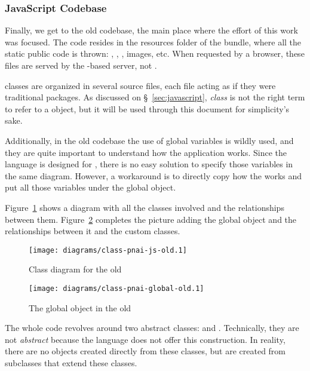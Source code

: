 \subsubsection{JavaScript Codebase} %
\label{ssub:jscodeold}

Finally, we get to the old  codebase, the main place where the effort of this work was focused.
The code resides in the resources folder of the  bundle, where all the static public code is thrown: , , , images, etc.
When requested by a browser, these files are served by the -based server, not .

 classes are organized in several source files, each file acting as if they were traditional packages.
As discussed on \S~\ref{sec:javascript}, \emph{class} is not the right term to refer to a  object, but it will be used through this document for simplicity's sake.

Additionally, in the old codebase the use of global variables is wildly used, and they are quite important to understand how the application works.
Since the  language is designed for , there is no easy solution to specify those variables in the same diagram.
However, a workaround is to directly copy how the  works and put all those variables under the global  object.

Figure~\ref{fig:class-pnai-js-old} shows a diagram with all the classes involved and the relationships between them.
Figure~\ref{fig:class-pnai-global-old} completes the picture adding the global object and the relationships between it and the custom classes.

\begin{figure}[htbp]
  \centering
    \texttt{[image: diagrams/class-pnai-js-old.1]}
  \caption{Class diagram for the old }
  \label{fig:class-pnai-js-old}
\end{figure}

\begin{figure}[htbp]
  \centering
    \texttt{[image: diagrams/class-pnai-global-old.1]}
  \caption{The global  object in the old }
  \label{fig:class-pnai-global-old}
\end{figure}

The whole code revolves around two abstract classes:  and .
Technically, they are not \emph{abstract} because the  language does not offer this construction.
In reality, there are no objects created directly from these classes, but are created from subclasses that extend these classes.

